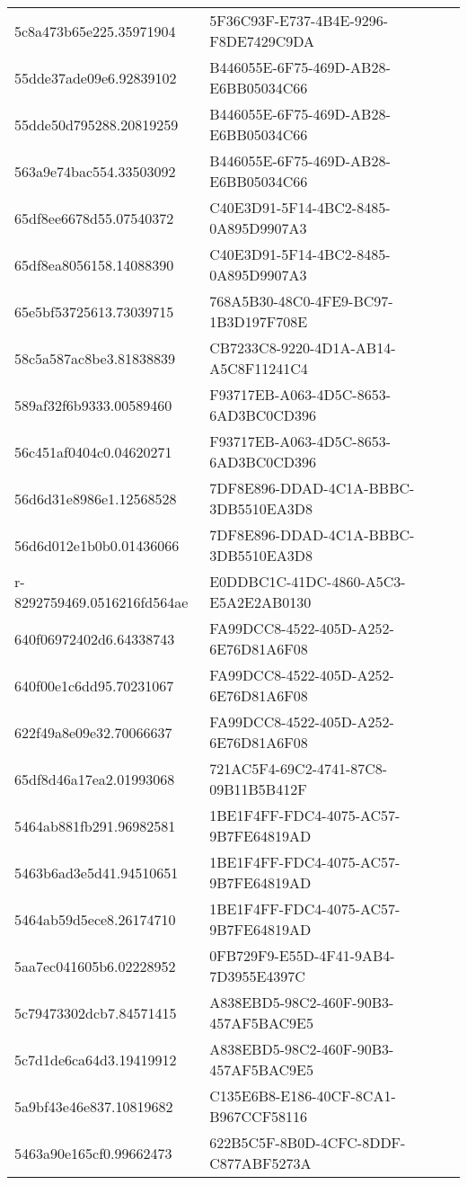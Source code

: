 \begin{tabular}{ll}
5c8a473b65e225.35971904 & 5F36C93F-E737-4B4E-9296-F8DE7429C9DA \\
55dde37ade09e6.92839102 & B446055E-6F75-469D-AB28-E6BB05034C66 \\
55dde50d795288.20819259 & B446055E-6F75-469D-AB28-E6BB05034C66 \\
563a9e74bac554.33503092 & B446055E-6F75-469D-AB28-E6BB05034C66 \\
65df8ee6678d55.07540372 & C40E3D91-5F14-4BC2-8485-0A895D9907A3 \\
65df8ea8056158.14088390 & C40E3D91-5F14-4BC2-8485-0A895D9907A3 \\
65e5bf53725613.73039715 & 768A5B30-48C0-4FE9-BC97-1B3D197F708E \\
58c5a587ac8be3.81838839 & CB7233C8-9220-4D1A-AB14-A5C8F11241C4 \\
589af32f6b9333.00589460 & F93717EB-A063-4D5C-8653-6AD3BC0CD396 \\
56c451af0404c0.04620271 & F93717EB-A063-4D5C-8653-6AD3BC0CD396 \\
56d6d31e8986e1.12568528 & 7DF8E896-DDAD-4C1A-BBBC-3DB5510EA3D8 \\
56d6d012e1b0b0.01436066 & 7DF8E896-DDAD-4C1A-BBBC-3DB5510EA3D8 \\
r-8292759469.0516216fd564ae & E0DDBC1C-41DC-4860-A5C3-E5A2E2AB0130 \\
640f06972402d6.64338743 & FA99DCC8-4522-405D-A252-6E76D81A6F08 \\
640f00e1c6dd95.70231067 & FA99DCC8-4522-405D-A252-6E76D81A6F08 \\
622f49a8e09e32.70066637 & FA99DCC8-4522-405D-A252-6E76D81A6F08 \\
65df8d46a17ea2.01993068 & 721AC5F4-69C2-4741-87C8-09B11B5B412F \\
5464ab881fb291.96982581 & 1BE1F4FF-FDC4-4075-AC57-9B7FE64819AD \\
5463b6ad3e5d41.94510651 & 1BE1F4FF-FDC4-4075-AC57-9B7FE64819AD \\
5464ab59d5ece8.26174710 & 1BE1F4FF-FDC4-4075-AC57-9B7FE64819AD \\
5aa7ec041605b6.02228952 & 0FB729F9-E55D-4F41-9AB4-7D3955E4397C \\
5c79473302dcb7.84571415 & A838EBD5-98C2-460F-90B3-457AF5BAC9E5 \\
5c7d1de6ca64d3.19419912 & A838EBD5-98C2-460F-90B3-457AF5BAC9E5 \\
5a9bf43e46e837.10819682 & C135E6B8-E186-40CF-8CA1-B967CCF58116 \\
5463a90e165cf0.99662473 & 622B5C5F-8B0D-4CFC-8DDF-C877ABF5273A \\

\end{tabular}
